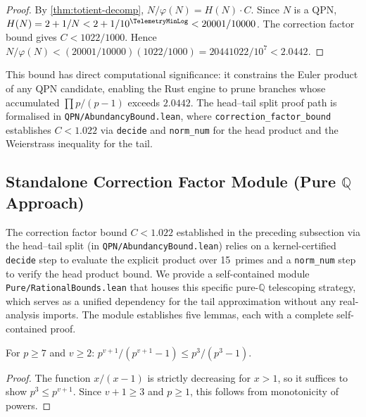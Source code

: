 \begin{proof}
By \cref{thm:totient-decomp}, $N/\varphi(N) = H(N) \cdot C$.
Since $N$ is a QPN, $H(N) = 2 + 1/N < 2 + 1/10^{\TelemetryMinLog} < 20001/10000$.
The correction factor bound gives $C < 1022/1000$.
Hence $N/\varphi(N) < (20001/10000)(1022/1000) = 20441022/10^7 < 2.0442$.
\end{proof}

This bound has direct computational significance: it constrains the
Euler product of any QPN candidate, enabling the Rust engine to prune
branches whose accumulated $\prod p/(p-1)$ exceeds $2.0442$.
The head--tail split proof path is formalised in \texttt{QPN/AbundancyBound.lean},
where \texttt{correction\_\allowbreak{}factor\_\allowbreak{}bound}
establishes $C < 1.022$ via \texttt{decide} and \texttt{norm\_\allowbreak{}num} for the
head product and the Weierstrass inequality for the tail.


\subsection{Standalone Correction Factor Module (Pure \texorpdfstring{$\mathbb{Q}$}{Q} Approach)}
\label{subsec:correction_factor_standalone}

The correction factor bound $C < 1.022$ established in the preceding
subsection via the head--tail split (in \texttt{QPN/AbundancyBound.lean}) relies on
a kernel-certified \texttt{decide} step to evaluate the explicit
product over 15~primes and a \texttt{norm\_\allowbreak{}num} step to verify
the head product bound. We provide
a self-contained module \texttt{Pure/RationalBounds.lean} that houses
this specific pure-$\mathbb{Q}$ telescoping strategy, which serves as a unified 
dependency for the tail approximation without any real-analysis imports. 
The module establishes five lemmas, each with a complete self-contained proof.

\begin{lemma}\label{lem:cf-mono}
For $p \ge 7$ and $v \ge 2$:
$p^{v+1}/(p^{v+1}-1) \le p^3/(p^3-1)$.
\end{lemma}
\begin{proof}
The function $x/(x-1)$ is strictly decreasing for $x > 1$, so it suffices
to show $p^3 \le p^{v+1}$.  Since $v+1 \ge 3$ and $p \ge 1$, this follows
from monotonicity of powers.
\end{proof}

